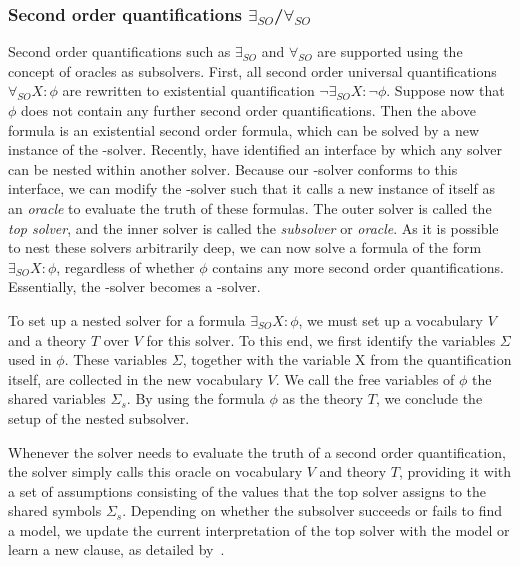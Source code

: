 \subsubsection{Second order quantifications $\exists_{SO}$/$\forall_{SO}$}
Second order quantifications such as $\exists_{SO}$ and $\forall_{SO}$ are supported using the concept of oracles as subsolvers.
First, all second order universal quantifications $\forall_{SO} X : \phi$ are rewritten to existential quantification $\neg \exists_{SO} X : \neg \phi$.
Suppose now that $\phi$ does not contain any further second order quantifications.
Then the above formula is an existential second order formula, which can be solved by a new instance of the \NP-solver.
Recently, \cite{AAAIW1612603} have identified an interface by which any solver can be nested within another solver.
Because our \NP-solver conforms to this interface, we can modify the \NP-solver such that it calls a new instance of itself as an \emph{oracle} to evaluate the truth of these formulas.
The outer solver is called the \emph{top solver}, and the inner solver is called the \emph{subsolver} or \emph{oracle}.
As it is possible to nest these solvers arbitrarily deep, we can now solve a formula of the form $\exists_{SO} X : \phi$, regardless of whether $\phi$ contains any more second order quantifications.
Essentially, the \NP-solver becomes a \QBF-solver.

To set up a nested solver for a formula $\exists_{SO} X : \phi$, we must set up a vocabulary $V$ and a theory $T$ over $V$ for this solver. 
To this end, we first identify the variables $\Sigma$ used in $\phi$.
These variables $\Sigma$, together with the variable X from the quantification itself, are collected in the new vocabulary $V$. 
We call the free variables of $\phi$ the shared variables $\Sigma_s$.
By using the formula $\phi$ as the theory $T$, we conclude the setup of the nested subsolver.

Whenever the solver needs to evaluate the truth of a second order quantification, the solver simply calls this oracle on vocabulary $V$ and theory $T$, providing it with a set of assumptions consisting of the values that the top solver assigns to the shared symbols $\Sigma_s$.
Depending on whether the subsolver succeeds or fails to find a model, we update the current interpretation of the top solver with the model or learn a new clause, as detailed by~\cite{AAAIW1612603}.

